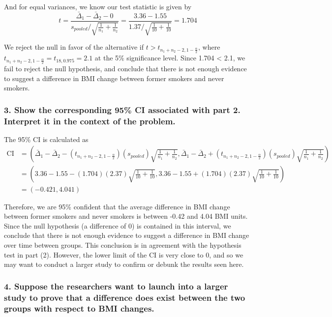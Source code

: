 \documentclass[]{article}
\begin{document}
And for equal variances, we know our test statistic is given by
\[t = \frac{\bar{\Delta}_1 - \bar{\Delta}_2 - 0}{s_{pooled}/\sqrt{\frac{1}{n_1} + \frac{1}{n_2}}} = \frac{3.36 - 1.55}{1.37/\sqrt{\frac{1}{10} + \frac{1}{10}}} = 1.704\]

We reject the null in favor of the alternative if
\(t > t_{n_1 + n_2 - 2, 1- \frac{\alpha}{2}}\), where
\(t_{n_1 + n_2 - 2, 1- \frac{\alpha}{2}} = t_{18, 0.975} = 2.1\) at the
5\% significance level. Since 1.704 \textless{} 2.1, we fail to reject
the null hypothesis, and conclude that there is not enough evidence to
suggest a difference in BMI change between former smokers and never
smokers.

\subsubsection{3. Show the corresponding 95\% CI associated with part 2.
Interpret it in the context of the
problem.}\label{show-the-corresponding-95-ci-associated-with-part-2.-interpret-it-in-the-context-of-the-problem.}

The 95\% CI is calculated as \[
\begin{aligned}
\text{CI} &= (\bar{\Delta}_1 - \bar{\Delta}_2 -  (t_{n_1 + n_2 - 2, 1- \frac{\alpha}{2}}) (s_{pooled}) \sqrt{\frac{1}{n_1} + \frac{1}{n_2}}, \bar{\Delta}_1 - \bar{\Delta}_2 +  (t_{n_1 + n_2 - 2, 1- \frac{\alpha}{2}}) (s_{pooled}) \sqrt{\frac{1}{n_1} + \frac{1}{n_2}}) \\
&= (3.36 - 1.55 -  (1.704) (2.37) \sqrt{\frac{1}{10} + \frac{1}{10}}, 3.36 - 1.55 + (1.704) (2.37) \sqrt{\frac{1}{10} + \frac{1}{10}}) \\
&= (-0.421, 4.041)
\end{aligned}
\]

Therefore, we are 95\% confident that the average difference in BMI
change between former smokers and never smokers is between -0.42 and
4.04 BMI units. Since the null hypothesis (a difference of 0) is
contained in this interval, we conclude that there is not enough
evidence to suggest a difference in BMI change over time between groups.
This conclusion is in agreement with the hypothesis test in part (2).
However, the lower limit of the CI is very close to 0, and so we may
want to conduct a larger study to confirm or debunk the results seen
here.

\subsubsection{4. Suppose the researchers want to launch into a larger
study to prove that a difference does exist between the two groups with
respect to BMI
changes.}\label{suppose-the-researchers-want-to-launch-into-a-larger-study-to-prove-that-a-difference-does-exist-between-the-two-groups-with-respect-to-bmi-changes.}
\end{document}
